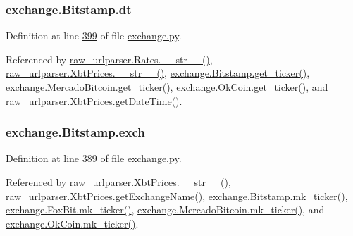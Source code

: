 \subsubsection[{\texorpdfstring{dt}{dt}}]{\setlength{\rightskip}{0pt plus 5cm}exchange.\+Bitstamp.\+dt}\hypertarget{classexchange_1_1_bitstamp_a527b7d7c5814118b5adfdaf0b960f036}{}\label{classexchange_1_1_bitstamp_a527b7d7c5814118b5adfdaf0b960f036}


Definition at line \hyperlink{exchange_8py_source_l00399}{399} of file \hyperlink{exchange_8py_source}{exchange.\+py}.



Referenced by \hyperlink{raw__urlparser_8py_source_l00038}{raw\+\_\+urlparser.\+Rates.\+\_\+\+\_\+str\+\_\+\+\_\+()}, \hyperlink{raw__urlparser_8py_source_l00074}{raw\+\_\+urlparser.\+Xbt\+Prices.\+\_\+\+\_\+str\+\_\+\+\_\+()}, \hyperlink{exchange_8py_source_l00401}{exchange.\+Bitstamp.\+get\+\_\+ticker()}, \hyperlink{exchange_8py_source_l00535}{exchange.\+Mercado\+Bitcoin.\+get\+\_\+ticker()}, \hyperlink{exchange_8py_source_l00600}{exchange.\+Ok\+Coin.\+get\+\_\+ticker()}, and \hyperlink{raw__urlparser_8py_source_l00059}{raw\+\_\+urlparser.\+Xbt\+Prices.\+get\+Date\+Time()}.

\subsubsection[{\texorpdfstring{exch}{exch}}]{\setlength{\rightskip}{0pt plus 5cm}exchange.\+Bitstamp.\+exch}\hypertarget{classexchange_1_1_bitstamp_a140f44d1638f2e50ecb5148bf8f8ac86}{}\label{classexchange_1_1_bitstamp_a140f44d1638f2e50ecb5148bf8f8ac86}


Definition at line \hyperlink{exchange_8py_source_l00389}{389} of file \hyperlink{exchange_8py_source}{exchange.\+py}.



Referenced by \hyperlink{raw__urlparser_8py_source_l00074}{raw\+\_\+urlparser.\+Xbt\+Prices.\+\_\+\+\_\+str\+\_\+\+\_\+()}, \hyperlink{raw__urlparser_8py_source_l00068}{raw\+\_\+urlparser.\+Xbt\+Prices.\+get\+Exchange\+Name()}, \hyperlink{exchange_8py_source_l00415}{exchange.\+Bitstamp.\+mk\+\_\+ticker()}, \hyperlink{exchange_8py_source_l00474}{exchange.\+Fox\+Bit.\+mk\+\_\+ticker()}, \hyperlink{exchange_8py_source_l00549}{exchange.\+Mercado\+Bitcoin.\+mk\+\_\+ticker()}, and \hyperlink{exchange_8py_source_l00614}{exchange.\+Ok\+Coin.\+mk\+\_\+ticker()}.

